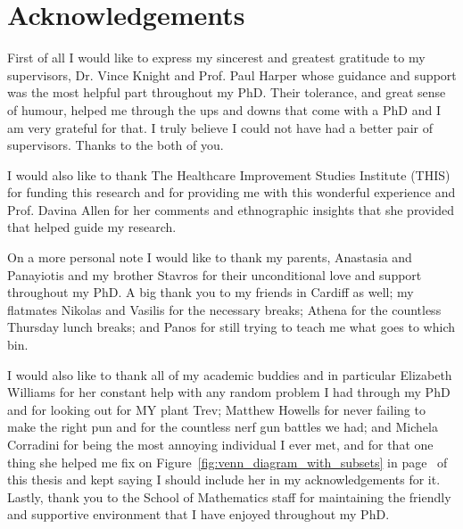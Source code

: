 \chapter*{Acknowledgements}
First of all I would like to express my sincerest and greatest gratitude to my
supervisors, Dr. Vince Knight and Prof. Paul Harper whose guidance and support
was the most helpful part throughout my PhD.
Their tolerance, and great sense of humour, helped me through the ups and downs
that come with a PhD and I am very grateful for that.
I truly believe I could not have had a better pair of supervisors.
Thanks to the both of you.

I would also like to thank The Healthcare Improvement Studies Institute (THIS)
for funding this research and for providing me with this wonderful experience
and Prof. Davina Allen for her comments and ethnographic insights that she
provided that helped guide my research.


On a more personal note I would like to thank my parents, Anastasia and
Panayiotis and my brother Stavros for their unconditional love and support
throughout my PhD.
A big thank you to my friends in Cardiff as well; my flatmates Nikolas and
Vasilis for the necessary breaks; Athena for the countless Thursday lunch
breaks; and Panos for still trying to teach me what goes to which bin.

I would also like to thank all of my academic buddies and in particular
Elizabeth Williams for her constant help with any random problem I had through
my PhD and for looking out for MY plant Trev; Matthew Howells for never failing
to make the right pun and for the countless nerf gun battles we had; and
Michela Corradini for being the most annoying individual I ever met, and for
that one thing she helped me fix on Figure~\ref{fig:venn_diagram_with_subsets}
in page~\pageref{fig:venn_diagram_with_subsets} of this thesis and kept saying
I should include her in my acknowledgements for it.
Lastly, thank you to the School of Mathematics staff for maintaining the
friendly and supportive environment that I have enjoyed throughout my PhD.
